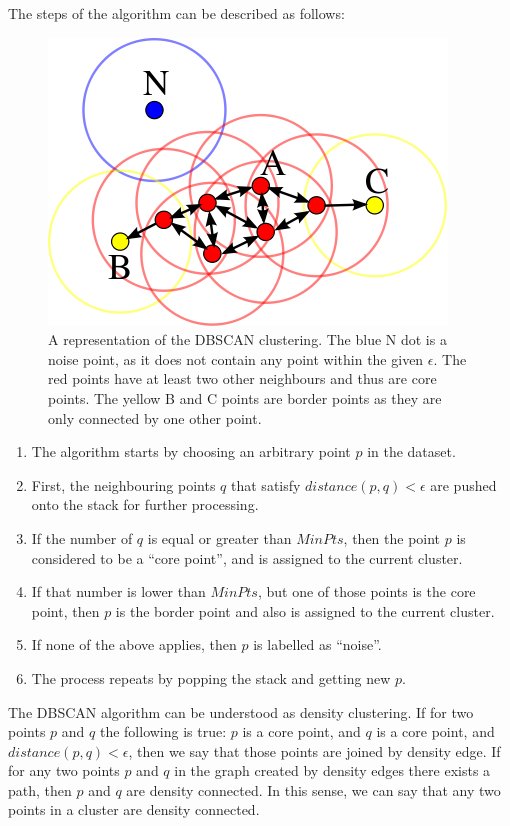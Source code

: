 The steps of the algorithm can be described as follows:

\begin{figure}
  \centering
  \includegraphics[width=0.45\linewidth]{figures/chapter3/400px-DBSCAN-Illustration.svg.png}
  \caption[dbscan]{A representation of the DBSCAN clustering. The blue N dot is a noise point, as it does not contain any point within the given $\epsilon$. The red points have at least two other neighbours and thus are core points. The yellow B and C points are border points as they are only connected by one other point.\footnotemark }
  \label{fig:dbscan}
\end{figure}




\begin{center}
\begin{enumerate}
\item The algorithm starts by choosing an arbitrary point $p$ in the dataset.
\item First, the neighbouring points $q$ that satisfy $ distance(p,q) < \epsilon$ are pushed onto the stack for further processing.
\item If the number of $q$ is equal or greater than $MinPts$, then the point $p$ is considered to be a ``core point'', and is assigned to the current cluster.
\item If that number is lower than $MinPts$, but one of those points is the core point, then $p$ is the border point and also is assigned to the current cluster.
\item If none of the above applies, then $p$ is labelled as ``noise''.
\item The process repeats by popping the stack and getting new $p$.
\end{enumerate}
\end{center}

The DBSCAN algorithm can be understood as density clustering.
If for two points $p$ and $q$ the following is true: $p$ is a core point, and $q$ is a core point, and  $distance(p,q) < \epsilon$, then we say that those points are joined by density edge.
If for any two points $p$ and $q$ in the graph created by density edges there exists a path, then $p$ and $q$ are density connected.
In this sense, we can say that any two points in a cluster are density connected.

